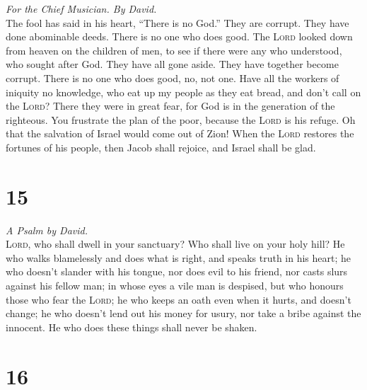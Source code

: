 \emph{For the Chief Musician. By David.}\\
 The fool has said in his heart, ``There is no God.'' They
are corrupt. They have done abominable deeds. There is no one who does
good.  The \textsc{Lord} looked down from heaven on the
children of men, to see if there were any who understood, who sought
after God.  They have all gone aside. They have together
become corrupt. There is no one who does good, no, not one.
 Have all the workers of iniquity no knowledge, who eat up
my people as they eat bread, and don't call on the \textsc{Lord}?
 There they were in great fear, for God is in the
generation of the righteous.  You frustrate the plan of
the poor, because the \textsc{Lord} is his refuge.  Oh
that the salvation of Israel would come out of Zion! When the
\textsc{Lord} restores the fortunes of his people, then Jacob shall
rejoice, and Israel shall be glad.

\hypertarget{section-14}{%
\section{15}\label{section-14}}

\emph{A Psalm by David.}\\
 \textsc{Lord}, who shall dwell in your sanctuary? Who
shall live on your holy hill?  He who walks blamelessly
and does what is right, and speaks truth in his heart;  he
who doesn't slander with his tongue, nor does evil to his friend, nor
casts slurs against his fellow man;  in whose eyes a vile
man is despised, but who honours those who fear the \textsc{Lord}; he
who keeps an oath even when it hurts, and doesn't change; 
he who doesn't lend out his money for usury, nor take a bribe against
the innocent. He who does these things shall never be shaken.

\hypertarget{section-15}{%
\section{16}\label{section-15}}

